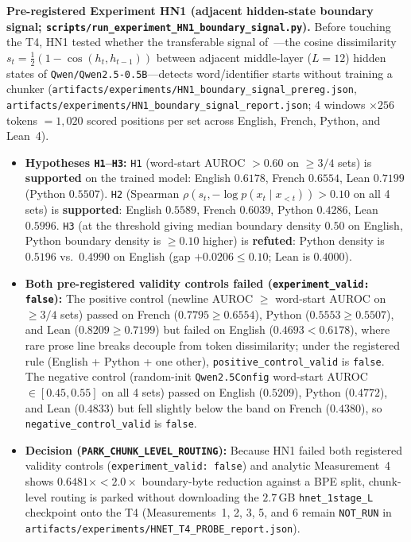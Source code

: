 \documentclass[11pt,a4paper]{article}
\begin{document}
\textbf{Pre-registered Experiment HN1 (adjacent hidden-state boundary signal; \texttt{scripts/\allowbreak run\_\allowbreak experiment\_\allowbreak HN1\_\allowbreak boundary\_\allowbreak signal.py}).} Before touching the T4, HN1 tested whether the transferable signal of~\cite{hwang2025hnet}---the cosine dissimilarity $s_t = \tfrac{1}{2}(1 - \cos(h_t, h_{t-1}))$ between adjacent middle-layer ($L=12$) hidden states of \texttt{Qwen/Qwen2.5-0.5B}---detects word/identifier starts without training a chunker (\texttt{artifacts/\allowbreak experiments/\allowbreak HN1\_\allowbreak boundary\_\allowbreak signal\_\allowbreak prereg.json}, \texttt{artifacts/\allowbreak experiments/\allowbreak HN1\_\allowbreak boundary\_\allowbreak signal\_\allowbreak report.json}; 4 windows $\times 256$ tokens $= 1{,}020$ scored positions per set across English, French, Python, and Lean~4).
\begin{itemize}[leftmargin=1.8em]
    \item \textbf{Hypotheses \texttt{H1}--\texttt{H3}:} \texttt{H1} (word-start AUROC $> 0.60$ on $\ge 3/4$ sets) is \textbf{supported} on the trained model: English $0.6178$, French $0.6554$, Lean $0.7199$ (Python $0.5507$). \texttt{H2} (Spearman $\rho(s_t, -\log p(x_t \mid x_{<t})) > 0.10$ on all 4 sets) is \textbf{supported}: English $0.5589$, French $0.6039$, Python $0.4286$, Lean $0.5996$. \texttt{H3} (at the threshold giving median boundary density $0.50$ on English, Python boundary density is $\ge 0.10$ higher) is \textbf{refuted}: Python density is $0.5196$ vs.\ $0.4990$ on English (gap $+0.0206 \le 0.10$; Lean is $0.4000$).
    \item \textbf{Both pre-registered validity controls failed (\texttt{experiment\_valid: false}):} The positive control (newline AUROC $\ge$ word-start AUROC on $\ge 3/4$ sets) passed on French ($0.7795 \ge 0.6554$), Python ($0.5553 \ge 0.5507$), and Lean ($0.8209 \ge 0.7199$) but failed on English ($0.4693 < 0.6178$), where rare prose line breaks decouple from token dissimilarity; under the registered rule (English + Python + one other), \texttt{positive\_control\_valid} is \texttt{false}. The negative control (random-init \texttt{Qwen2.5Config} word-start AUROC $\in [0.45, 0.55]$ on all 4 sets) passed on English ($0.5209$), Python ($0.4772$), and Lean ($0.4833$) but fell slightly below the band on French ($0.4380$), so \texttt{negative\_control\_valid} is \texttt{false}.
    \item \textbf{Decision (\texttt{PARK\_CHUNK\_LEVEL\_ROUTING}):} Because HN1 failed both registered validity controls (\texttt{experiment\_valid: false}) and analytic Measurement~4 shows $0.6481\times < 2.0\times$ boundary-byte reduction against a BPE split, chunk-level routing is parked without downloading the $2.7$\,GB \texttt{hnet\_1stage\_L} checkpoint onto the T4 (Measurements~1, 2, 3, 5, and 6 remain \texttt{NOT\_RUN} in \texttt{artifacts/\allowbreak experiments/\allowbreak HNET\_\allowbreak T4\_\allowbreak PROBE\_\allowbreak report.json}).
\end{itemize}
\end{document}
